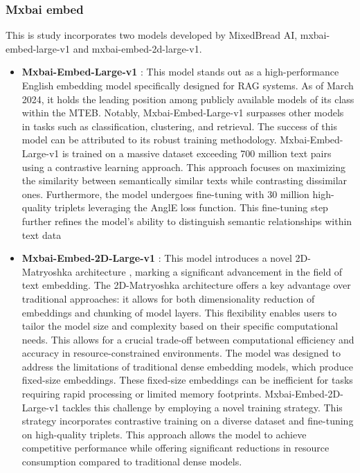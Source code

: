 \subsubsection{Mxbai embed}
This is study incorporates two models developed by MixedBread AI, mxbai-embed-large-v1 and mxbai-embed-2d-large-v1. 
\begin{itemize}
  \item \textbf{Mxbai-Embed-Large-v1} \cite{emb2024mxbai}:
    This model stands out as a high-performance English embedding model specifically designed for \ac{RAG} systems.
    As of March 2024, it holds the leading position among publicly available models of its class within the \ac{MTEB}.
    Notably, Mxbai-Embed-Large-v1 surpasses other models in tasks such as classification, clustering, and retrieval.
    The success of this model can be attributed to its robust training methodology.
    Mxbai-Embed-Large-v1 is trained on a massive dataset exceeding 700 million text pairs using a contrastive learning approach.
    This approach focuses on maximizing the similarity between semantically similar texts while contrasting dissimilar ones.
    Furthermore, the model undergoes fine-tuning with 30 million high-quality triplets leveraging the AnglE loss function.
    This fine-tuning step further refines the model's ability to distinguish semantic relationships within text data
  \item \textbf{Mxbai-Embed-2D-Large-v1} \cite{emb2024mxbai2d}:
    This model introduces a novel 2D-Matryoshka architecture \cite{li20242d}, marking a significant advancement in the field of text embedding.
    The 2D-Matryoshka architecture offers a key advantage over traditional approaches: it allows for both dimensionality reduction of embeddings and chunking of model layers.
    This  flexibility enables users to tailor the model size and complexity based on their specific computational needs.
    This allows for a crucial trade-off between computational efficiency and accuracy in resource-constrained environments.
    The model was designed to address the limitations of traditional dense embedding models, which produce fixed-size embeddings.
    These fixed-size embeddings can be inefficient for tasks requiring rapid processing or limited memory footprints.
    Mxbai-Embed-2D-Large-v1 tackles this challenge by employing a novel training strategy.
    This strategy incorporates contrastive training on a diverse dataset and fine-tuning on high-quality triplets.
    This approach allows the model to achieve competitive performance while offering significant reductions in resource consumption compared to traditional dense models.
\end{itemize}

